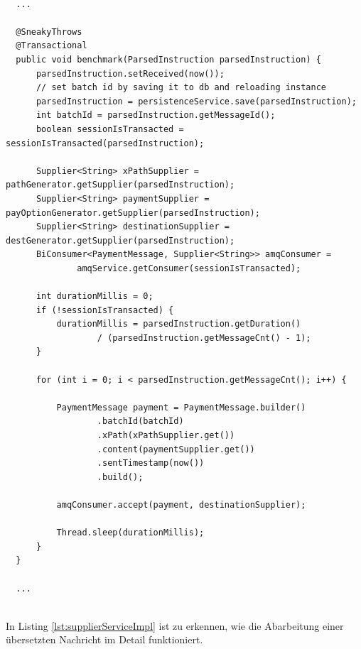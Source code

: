 \begin{lstlisting}[style=javaStyle,caption={Supplier - Service},label=lst:supplierServiceImpl]

  ...

  @SneakyThrows
  @Transactional
  public void benchmark(ParsedInstruction parsedInstruction) {
      parsedInstruction.setReceived(now());
      // set batch id by saving it to db and reloading instance
      parsedInstruction = persistenceService.save(parsedInstruction);
      int batchId = parsedInstruction.getMessageId();
      boolean sessionIsTransacted = sessionIsTransacted(parsedInstruction);

      Supplier<String> xPathSupplier = pathGenerator.getSupplier(parsedInstruction);
      Supplier<String> paymentSupplier = payOptionGenerator.getSupplier(parsedInstruction);
      Supplier<String> destinationSupplier = destGenerator.getSupplier(parsedInstruction);
      BiConsumer<PaymentMessage, Supplier<String>> amqConsumer =
              amqService.getConsumer(sessionIsTransacted);

      int durationMillis = 0;
      if (!sessionIsTransacted) {
          durationMillis = parsedInstruction.getDuration()
                  / (parsedInstruction.getMessageCnt() - 1);
      }

      for (int i = 0; i < parsedInstruction.getMessageCnt(); i++) {

          PaymentMessage payment = PaymentMessage.builder()
                  .batchId(batchId)
                  .xPath(xPathSupplier.get())
                  .content(paymentSupplier.get())
                  .sentTimestamp(now())
                  .build();

          amqConsumer.accept(payment, destinationSupplier);

          Thread.sleep(durationMillis);
      }
  }

  ...
  
\end{lstlisting}

In Listing \ref{lst:supplierServiceImpl} ist zu erkennen, wie die Abarbeitung einer übersetzten Nachricht im Detail funktioniert.


